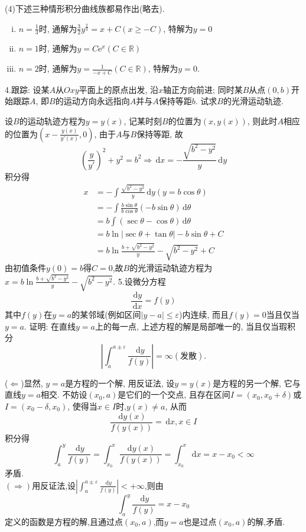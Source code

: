 \documentclass[titlepage,11pt,a4paper,twoside]{report}
\makeatletter
\newcommand\diff{\,\mathrm{d}}
\newcommand\e{\mathrm{e}}
\newenvironment{solve}{\par
	\pushQED{\qed}%
	\normalfont \topsep1\p@\@plus6\p@\relax
	\trivlist
	\item\relax
	{\hspace*{\parindent}{\heiti 解}\@addpunct{:}}\hspace\labelsep\ignorespaces
}{%
	\popQED\endtrivlist\@endpefalse
}
\makeatother
\begin{document}
\begin{solve}
\newline
(4)下述三种情形积分曲线族都易作出(略去).
\begin{enumerate}[(i)]
\item $n=\frac{1}{3}$时, 通解为$\frac{3}{2}y^{\frac{2}{3}}=x+C(x\geq-C)$, 特解为$y=0$
\item $n=1$时, 通解为$y=C\e^x(C\in\mathbb{R})$
\item $n=2$时, 通解为$y=\frac{1}{-x+C}(C\in\mathbb{R})$, 特解为$y=0$.
\end{enumerate}
\end{solve}
4.跟踪: 设某$A$从$Oxy$平面上的原点出发, 沿$x$轴正方向前进; 同时某$B$从点$(0,b)$开始跟踪$A$, 即$B$的运动方向永远指向$A$并与$A$保持等距$b$. 试求$B$的光滑运动轨迹.
\begin{solve}设$B$的运动轨迹方程为$y=y(x)$, 记某时刻$B$的位置为$(x,y(x))$, 则此时$A$相应的位置为$\left(x-\frac{y(x)}{y'(x)},0\right)$, 由于$A$与$B$保持等距, 故
\[\left(\frac{y}{y'}\right)^2+y^2=b^2\Rightarrow\diff x=-\frac{\sqrt{b^2-y^2}}{y}\diff y\]
积分得
\[\begin{split}
x&=-\int\frac{\sqrt{b^2-y^2}}{y}\diff y(y=b\cos\theta)\\
&=-\int\frac{b\sin\theta}{b\cos\theta}(-b\sin\theta)\diff\theta\\
&=b\int(\sec\theta-\cos\theta)\diff\theta\\
&=b\ln|\sec\theta+\tan\theta|-b\sin\theta+C\\
&=b\ln\frac{b+\sqrt{b^2-y^2}}{y}-\sqrt{b^2-y^2}+C
\end{split}\]
由初值条件$y(0)=b$得$C=0$,故$B$的光滑运动轨迹方程为$x=b\ln\frac{b+\sqrt{b^2-y^2}}{y}-\sqrt{b^2-y^2}$.
\end{solve}
5.设微分方程
\[\frac{\diff y}{\diff x}=f(y)\]
其中$f(y)$在$y=a$的某邻域(例如区间$|y-a|\leq\varepsilon$)内连续, 而且$f(y)=0$当且仅当$y=a$. 证明: 在直线$y=a$上的每一点, 上述方程的解是局部唯一的, 当且仅当瑕积分
\[\left|\int_a^{a\pm\varepsilon}\frac{\diff y}{f(y)}\right|=\infty(\mbox{发散}).\]
\begin{solve}($\Leftarrow$)显然, $y=a$是方程的一个解, 用反证法, 设$y=y(x)$是方程的另一个解, 它与直线$y=a$相交. 不妨设$(x_0,a)$是它们的一个交点, 且存在区间$I=(x_0,x_0+\delta)$或$I=(x_0-\delta,x_0)$, 使得当$x\in I$时,$y(x)\neq a$, 从而
\[\frac{\diff y(x)}{f(y(x))}=\diff x,x\in I\]
积分得
\[\int_a^y\frac{\diff y}{f(y)}=\int_{x_0}^x\frac{\diff y(x)}{f(y(x))}=\int_{x_0}^x\diff x=x-x_0<\infty\]
矛盾.\\
$(\Rightarrow)$用反证法,设$\left|\int_a^{a\pm\varepsilon}\frac{\diff y}{f(y)}\right|<+\infty$,则由
\[\int_a^y\frac{\diff y}{f(y)}=x-x_0\]
定义的函数是方程的解,且通过点$(x_0,a)$,而$y=a$也是过点$(x_0,a)$的解,矛盾.
\end{solve}
\end{document}
